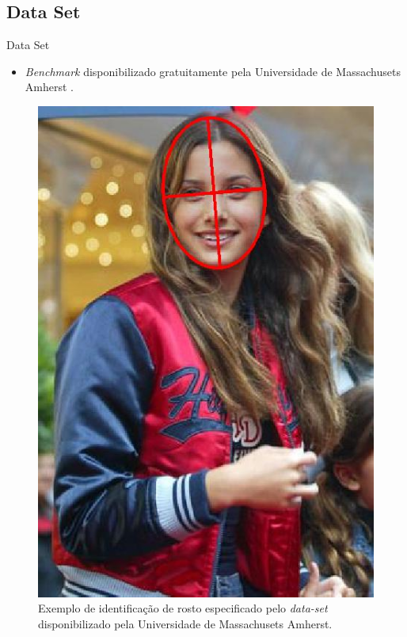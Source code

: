 \documentclass[aspectratio=169, xcolor=dvipsnames]{beamer}
\let\olditem=\item%
\renewcommand{\item}{\olditem \justifying}
\begin{document}
	\subsection{Data Set}
	\begin{frame}{Data Set}

		\begin{multicols*}{2}

			\begin{itemize}
				\item \textit{Benchmark} disponibilizado gratuitamente pela Universidade de Massachusets Amherst \cite{fddbTech}.
			\end{itemize}

			\begin{figure}[H]
				\centering
				\includegraphics[width=0.52\linewidth]{img/data_set.jpg}
				\caption{Exemplo de identificação de rosto especificado pelo \textit{data-set} disponibilizado pela Universidade de Massachusets Amherst.}
				\label{fig:mulher}
			\end{figure}
		\end{multicols*}
	\end{frame}

\frame{\titlepage}




\frame{\titlepage}
\end{document}
